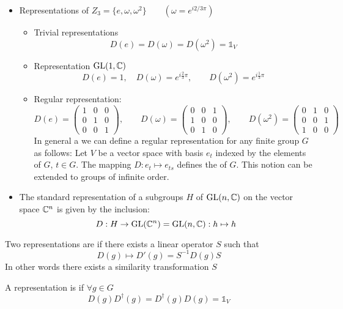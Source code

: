 \begin{example}
\begin{itemize}
\item Representations of $Z_3 = \{e,\omega, \omega^2\} \qquad (\omega = e^{i2/3\pi})$
\begin{itemize}
\item Trivial representations
\[D(e) = D(\omega) = D(\omega^2) = \mathbb{1}_V\]
\item Representation $\operatorname{GL}(1, \mathbb{C})$
\[ D(e) = 1, \quad D(\omega) = e^{i\frac{2}{3}\pi} , \qquad D(\omega^2) = e^{i\frac{1}{3}\pi} \]
\item Regular representation:
\[D(e) = 
\begin{pmatrix}
1&0&0\\0&1&0\\0&0&1
\end{pmatrix}, \qquad D(\omega) = \begin{pmatrix}
0&0&1\\1&0&0\\0&1&0
\end{pmatrix}, \qquad D(\omega^2) = \begin{pmatrix}
0&1&0\\0&0&1\\1&0&0
\end{pmatrix}
\]
In general a we can define a regular representation for any finite group $G$ as follows: Let $V$ be a vector space with basis $e_t$ indexed by the elements of $G$, $t \in G$. The mapping $D: e_t \mapsto e_{ts}$ defines the  of $G$. This notion can be extended to groups of infinite order.
\end{itemize}
\item The standard representation of a subgroups $H$ of $\operatorname{GL}(n,\mathbb{C})$ on the vector space $\mathbb{C}^n$ is given by the inclusion:
\[ D: H \to \operatorname{GL}(\mathbb{C}^n) = \operatorname{GL}(n,\mathbb{C}): h \mapsto h \]
\end{itemize}
\end{example}


\begin{definition}
Two representations are  if there exists a linear operator $S$ such that
\[D(g) \mapsto D'(g) = S^{-1}D(g)S\]
In other words there exists a similarity transformation $S$
\end{definition}

\begin{definition}
A representation is  if $\forall g \in G$
\[D(g)D^\dagger(g) = D^\dagger(g)D(g) = \mathbb{1}_V\]
\end{definition}


